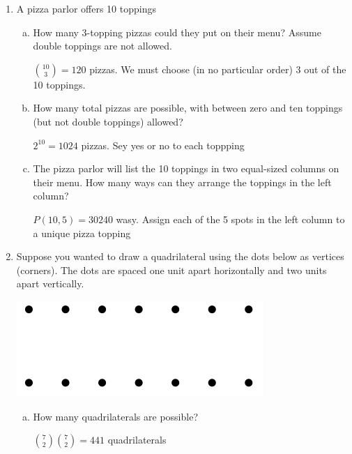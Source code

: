 \documentclass[11pt, a4paper]{article}
\newcommand\setItemNumber[1]{\setcounter{enumi}{\numexpr#1-1\relax}}
\begin{document}
    \begin{enumerate}

        \item A pizza parlor offers 10 toppings
            \begin{enumerate}[(a)]
                \item How many 3-topping pizzas could they put on their menu? Assume double toppings are not allowed.

                    ${10\choose 3} = 120$ pizzas. We must choose (in no particular order) 3 out of the 10 toppings. 

                \item How many total pizzas are possible, with between zero and ten toppings (but not double toppings) allowed?

                    $2^10 = 1024$ pizzas. Sey yes or no to each toppping

                \item The pizza parlor will list the 10 toppings in two equal-sized columns on their menu. How many ways can they arrange the toppings in the left column?

                $P(10,5) = 30240$ wasy. Assign each of the 5 spots in the left column to a unique pizza topping

            \end{enumerate}

        \setItemNumber{5}
        \item Suppose you wanted to draw a quadrilateral using the dots below as vertices (corners). The dots are spaced one unit apart horizontally and two units apart vertically.

            \begin{center}
            \includegraphics[width=.5\textwidth]{hw4_graphic1}
            \end{center}

            \begin{enumerate}[(a)]
                \item How many quadrilaterals are possible?

                ${7\choose 2}{7\choose 2} = 441$ quadrilaterals


\end{enumerate}
\end{enumerate}
\end{document}

